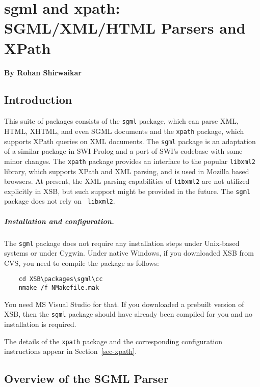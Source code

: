 
\chapter{sgml and xpath: SGML/XML/HTML Parsers and XPath}

  \begin{center}
    {\Large {\bf By Rohan Shirwaikar}}
  \end{center}



\section{Introduction}
This suite of packages consists of the {\tt sgml} package, which can parse
XML, HTML, XHTML, and even SGML documents and the {\tt xpath} package, which
supports XPath queries on XML documents.  The {\tt sgml} package is an
adaptation of a similar package in SWI Prolog and a port of SWI's codebase with
some minor changes. The {\tt xpath} package provides an interface to the
popular {\tt libxml2} library, which supports XPath and XML parsing, and is
used in Mozilla based browsers. At present, the XML parsing capabilities of
{\tt libxml2} are not utilized explicitly in XSB, but such support might be
provided in the future. The {\tt sgml} package does not rely on {\tt
  libxml2}.

\paragraph{Installation and configuration.}
The {\tt sgml} package does not require any installation steps under
Unix-based systems or under Cygwin. Under native Windows, if you downloaded XSB
from CVS, you need to compile the package as follows:
\begin{verbatim}
    cd XSB\packages\sgml\cc
    nmake /f NMakefile.mak
\end{verbatim}
You need MS Visual Studio for that. If you downloaded a prebuilt version
of XSB, then the {\tt sgml}  package should have already been compiled for you
and no installation is required.

The details of the {\tt xpath} package and the corresponding configuration
instructions appear in Section~\ref{sec-xpath}.

\section{Overview of the SGML Parser}

